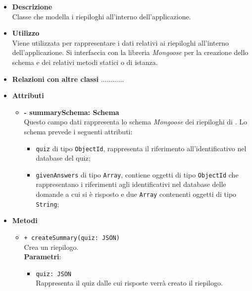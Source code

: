 \begin{itemize}
	\item \textbf{Descrizione} \\
	Classe che modella i riepiloghi all'interno dell'applicazione.
	\item \textbf{Utilizzo} \\
	Viene utilizzata per rappresentare i dati relativi ai riepiloghi all'interno dell'applicazione. Si interfaccia con la libreria \textit{Mongoose} per la creazione dello schema e dei relativi metodi statici o di istanza.
	\item \textbf{Relazioni con altre classi}
		............
	\item \textbf{Attributi}
		\begin{itemize}
			\item \textbf{- summarySchema: Schema} \\
			Questo campo dati rappresenta lo schema \textit{Mongoose} dei riepiloghi di \progetto. Lo schema prevede i seguenti attributi:
				\begin{itemize}
					\item \texttt{quiz} di tipo \texttt{ObjectId}, rappresenta il riferimento all'identificativo nel database del quiz;
					\item \texttt{givenAnswers} di tipo \texttt{Array}, contiene oggetti di tipo \texttt{ObjectId} che rappresentano i riferimenti agli identificativi nel database delle domande a cui si è risposto e due \texttt{Array} contenenti oggetti di tipo \texttt{String};	
				\end{itemize}
		\end{itemize}
	\item \textbf{Metodi}
		\begin{itemize}
			\item \texttt{+ createSummary(quiz: JSON)}\\
			Crea un riepilogo.\\
			\textbf{Parametri}:
			\begin{itemize}
				\item \texttt{quiz: JSON}\\
				Rappresenta il quiz dalle cui risposte verrà creato il riepilogo.
			\end{itemize}
		\end{itemize}
\end{itemize}